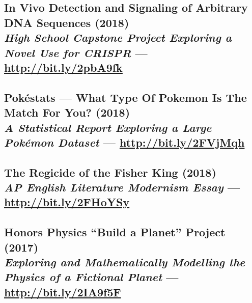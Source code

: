 \documentclass[twocolumn, a4paper, fontsize=9pt, headsepline, footsepline]{scrartcl}
\begin{document}
\subsection*{In Vivo Detection and Signaling of Arbitrary DNA Sequences
  (2018)\\\vspace{-3pt}\hspace{14.22636pt}\textmd{\emph{High School Capstone Project Exploring
    a Novel Use for CRISPR} — \url{http://bit.ly/2pbA9fk}}}

\subsection*{Pokéstats — What Type Of Pokemon Is The Match For You?
  (2018)\\\vspace{-2pt}\hspace{14.22636pt}\textmd{\emph{A Statistical Report Exploring a
    Large Pokémon Dataset} — \url{http://bit.ly/2FVjMqh}}}

\subsection*{The Regicide of the Fisher King (2018)\\\vspace{-2pt}\hspace{14.22636pt}\textmd{\emph{AP English
    Literature Modernism Essay} — \url{http://bit.ly/2FHoYSy}}}

\subsection*{Honors Physics “Build a Planet” Project (2017)\\\vspace{-2pt}\hspace{14.22636pt}\textmd{\emph{Exploring and
    Mathematically Modelling the Physics of a Fictional Planet} —
    \url{http://bit.ly/2IA9f5F}}}

\end{document}
